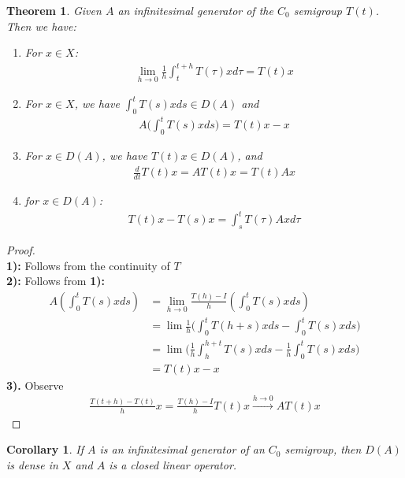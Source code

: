 \documentclass[a4paper,11pt,fleqn]{book}
\newtheorem{theorem}{Theorem}[section]
\newtheorem{corollary}{Corollary}[theorem]
\theoremstyle{definition}
\theoremstyle{remark}
\begin{document}
\begin{theorem}
	Given $A$ an infinitesimal generator of the $C_0$ semigroup $T(t)$. Then we have:
	\begin{enumerate}
		\item For $x \in X$:
		\begin{align*}
			\lim_{h \rightarrow 0} \frac{1}{h} \int_{t}^{t + h} T(\tau) x d\tau = T(t) x 
		\end{align*}
		\item For $x \in X$, we have $ \int_0^t T(s) xds \in D(A)$ and
		\begin{align*}
			A\bigg(\int_0^tT(s)xds\bigg) = T(t)x - x
		\end{align*}
		\item
		For $x \in D(A)$, we have $T(t)x \in D(A)$, and 
		\begin{align*}
			\frac{d}{dt} T(t) x = AT(t) x  = T(t) Ax
		\end{align*}
		\item for $x \in D(A)$:
		\begin{align*}
			T(t)x - T(s)x = \int_s^t T(\tau)A x d\tau
		\end{align*}
	\end{enumerate}
\end{theorem}
\begin{proof}
\quad\\
\textbf{1):} Follows from the continuity of $T$\\
\textbf{2):} Follows from \textbf{1):}
\begin{align*}
	A(\int_0^t T(s)x ds ) &= \lim_{h \rightarrow 0} \frac{T(h) - I}{h}(\int_0^t T(s) x ds)\\
	&= \lim \frac{1}{h} \bigg( \int_0^tT(h + s) x ds  - \int_0^t T(s)x ds \bigg)\\
	&= \lim \bigg( \frac{1}{h} \int_h^{h + t} T(s) x ds  - \frac{1}{h} \int_0^t T(s) xds \bigg)\\
	&= T(t)x - x 
\end{align*}
\textbf{3).} Observe
\begin{align*}
	\frac{T(t + h) - T(t)}{h} x = \frac{T(h) - I}{h} T(t)x \overset{h \rightarrow 0}{\longrightarrow} AT(t)x
\end{align*}
\end{proof}


\begin{corollary}
	If $A$ is an infinitesimal generator of an $C_0$ semigroup, then $D(A)$ is dense in $X$ and $A$ is a closed linear operator.
\end{corollary}
\end{document}
